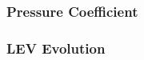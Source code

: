 \subsubsection{Pressure Coefficient}

\label{sec:zonal_cp_Re200k}

\subsubsection{LEV Evolution}

\label{sec:zonal_LEV_Re200k}




%

